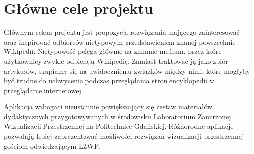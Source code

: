 \section{Główne cele projektu}
Głównym celem projektu jest propozycja rozwiązania mającego zainteresować oraz inspirować odbiorców nietypowym przedstawieniem znanej powszechnie Wikipedii. Nietypowość polega głównie na zmianie medium, przez które użytkownicy zwykle odbierają Wikipedię. Zamiast traktować ją jako zbiór artykułów, skupiamy się na uwidocznieniu związków między nimi, które mogłyby być trudne do uchwycenia podczas przeglądania stron encyklopedii w przeglądarce internetowej.

Aplikacja wzbogaci nieustannie powiększający się zestaw materiałów dydaktycznych przygotowywanych w środowisku Laboratorium Zanurzonej Wizualizacji Przestrzennej na Politechnice Gdańskiej. Różnorodne aplikacje pozwalają lepiej zaprezentować możliwości rozwiązań wizualizacji przestrzennej gościom odwiedzającym LZWP.